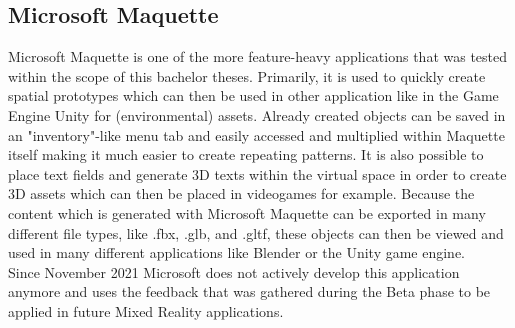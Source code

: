 \documentclass{report}
\begin{document}
		\subsection[Microsoft Maquette]{Microsoft Maquette \textsc{\small{\cite{MSM}}}}
		\startsubsection
			Microsoft Maquette is one of the more feature-heavy applications that was tested within the scope of this bachelor theses. Primarily, it is used to quickly create spatial prototypes which can then be used in other application like in the Game Engine Unity for (environmental) assets. Already created objects can be saved in an "inventory"-like menu tab and easily accessed and multiplied within Maquette itself making it much easier to create repeating patterns. It is also possible to place text fields and generate 3D texts within the virtual space in order to create 3D assets which can then be placed in videogames for example. Because the content which is generated with Microsoft Maquette can be exported in many different file types, like .fbx, .glb, and .gltf, these objects can then be viewed and used in many different applications like Blender or the Unity game engine. \\
			Since November 2021 Microsoft does not actively develop this application anymore and uses the feedback that was gathered during the Beta phase to be applied in future Mixed Reality applications.
		\closesection
	\closesection
			
\end{document}
